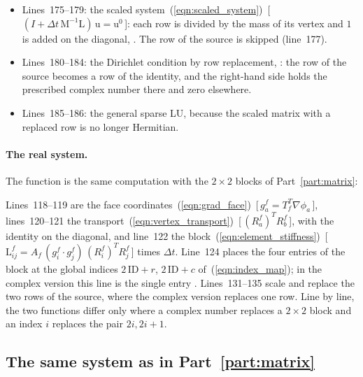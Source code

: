 \begin{itemize}
\item Lines~175--179: the scaled system~(\ref{eqn:scaled_system})~[\,$(I + \Delta t\,\mathrm M^{-1}\mathrm L)\,\mathrm u = \mathrm u^0$\,]: each row is divided by the mass of its vertex and $1$ is added on the diagonal, . The row of the source is skipped (line~177).
\item Lines~180--184: the Dirichlet condition by row replacement, : the row of the source becomes a row of the identity, and the right-hand side holds the prescribed complex number there and zero elsewhere.
\item Lines~185--186: the general sparse LU, because the scaled matrix with a replaced row is no longer Hermitian.
\end{itemize}

\paragraph{The real system.} The function  is the same computation with the $2\times 2$ blocks of Part~\ref{part:matrix}:

Lines~118--119 are the face coordinates~(\ref{eqn:grad_face})~[\,$g_a^f = T_f^T\nabla\phi_a$\,], lines~120--121 the transport~(\ref{eqn:vertex_transport})~[\,$(R_a^f)^T R_b^f$\,], with the identity on the diagonal, and line~122 the block~(\ref{eqn:element_stiffness})~[\,$\mathrm L^f_{ij} = A_f\,(g_i^f\cdot g_j^f)\,(R_i^f)^TR_j^f$\,] times $\Delta t$. Line~124 places the four entries of the block at the global indices $2\,\mathrm{ID} + r$, $2\,\mathrm{ID} + c$ of~(\ref{eqn:index_map}); in the complex version this line is the single entry . Lines~131--135 scale and replace the two rows of the source, where the complex version replaces one row. Line by line, the two functions differ only where a complex number replaces a $2\times 2$ block and an index $i$ replaces the pair $2i, 2i+1$.

\subsection{The same system as in Part~\ref{part:matrix}}


